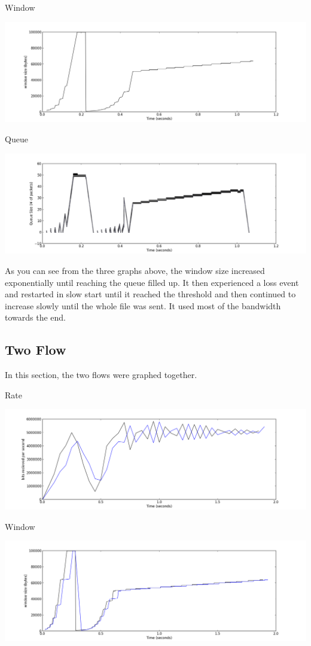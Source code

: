 \documentclass[11pt]{article}
\begin{document}
Window

\centerline{\includegraphics[width=22cm]{window_time_one.png}}

Queue

\centerline{\includegraphics[width=22cm]{queue_time_one.png}}

As you can see from the three graphs above, the window size increased exponentially until reaching the queue filled up. It then experienced a loss event and restarted in slow start until it reached the threshold and then continued to increase slowly until the whole file was sent. It used most of the bandwidth towards the end.

\subsection{Two Flow}

In this section, the two flows were graphed together.

Rate

\centerline{\includegraphics[width=22cm]{plot_rate_two.png}}

Window

\centerline{\includegraphics[width=22cm]{window_time_two.png}}
\end{document}
